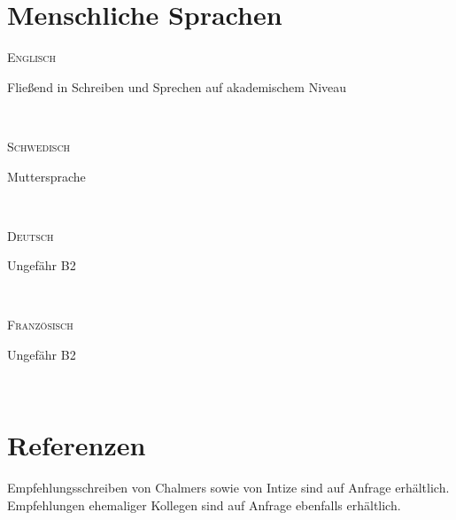 \documentclass[letterpaper,
		10pt]{article}
\newcommand{\entry}[4]{
\ifthenelse{\isempty{#3}}
{\slimentry{#1}{#2}}{

\begin{minipage}[t]{.15\linewidth}
\hfill \textsc{#1}
\end{minipage}
\hfill\vline\hfill
\begin{minipage}[t]{.80\linewidth}
{\bf#2}\\\textit{#3} \small{#4}
\end{minipage}\\
\vspace{.2cm}
}}
\newcommand{\slimentry}[2]{
\begin{minipage}[t]{.15\linewidth}
\hfill \textsc{#1}
\end{minipage}
\hfill\vline\hfill
\begin{minipage}[t]{.80\linewidth}
#2
\end{minipage}\\
\vspace{.25cm}
}
\newcommand{\sentry}[2]{
\begin{minipage}[t]{.15\linewidth}
\hfill \textsc{#1}
\end{minipage}
\hfill\vline\hfill
\begin{minipage}[t]{.80\linewidth}
#2
\end{minipage}\\
\vspace{-.15cm}
}%
\begin{document}
\section{Menschliche Sprachen}

\sentry{Englisch}{Fließend in Schreiben und Sprechen auf akademischem Niveau}

\sentry{Schwedisch}{Muttersprache}

\sentry{Deutsch}{Ungefähr B2}

\sentry{Französisch}{Ungefähr B2}


\section{Referenzen}
    
Empfehlungsschreiben von Chalmers sowie von Intize sind auf Anfrage erhältlich. Empfehlungen ehemaliger Kollegen sind auf Anfrage ebenfalls erhältlich.
\end{document}
